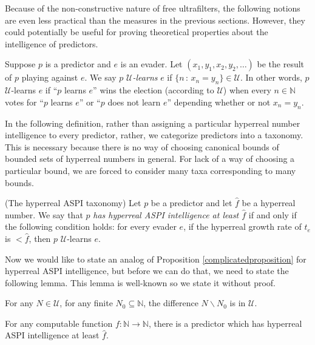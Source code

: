 \documentclass[twoside,11pt]{article}
\begin{document}
Because of the non-constructive nature of free ultrafilters, the following notions
are even less practical than the measures in the previous sections.
However, they could potentially be useful for
proving theoretical properties about the intelligence of predictors.

\begin{definition}
\label{Ulearndefn}
    Suppose $p$ is a predictor and $e$ is an evader. Let
    $(x_1,y_1,x_2,y_2,\ldots)$ be the result of $p$ playing against $e$.
    We say $p$ \emph{$\mathcal U$-learns} $e$ if
    $\{n\,:\,x_n=y_n\}\in\mathcal U$.
    In other words, $p$ $\mathcal U$-learns $e$ if ``$p$ learns $e$''
    wins the election (according to $\mathcal U$)
    when every $n\in\mathbb N$ votes for ``$p$ learns $e$''
    or ``$p$ does not learn $e$'' depending whether or not $x_n=y_n$.
\end{definition}

In the following
definition, rather than assigning a particular hyperreal number intelligence to every
predictor, rather, we categorize predictors into a taxonomy.
This is necessary because there is no way of choosing canonical bounds
of bounded sets of hyperreal numbers in general. For lack of a way of
choosing a particular bound, we are forced to consider many taxa corresponding
to many bounds.

\begin{definition}
\label{hyperrealhibbardintelligencedefn}
    (The hyperreal ASPI taxonomy)
    Let $p$ be a predictor and let $\hat f$ be a hyperreal number.
    We say that $p$ \emph{has hyperreal ASPI intelligence at least $\hat f$}
    if and only if the following condition holds:
    for every evader $e$, if the hyperreal growth rate of $t_e$ is
    $<\hat f$, then $p$ $\mathcal U$-learns $e$.
\end{definition}

Now we would like to state an analog of Proposition \ref{complicatedproposition}
for hyperreal ASPI intelligence, but before we can do that, we need to state the
following lemma. This lemma is well-known so we state it without proof.

\begin{lemma}
\label{technicallemmaaboutultrafilters}
    For any $N\in\mathcal U$, for any finite $N_0\subseteq\mathbb N$,
    the difference $N\backslash N_0$ is in $\mathcal U$.
\end{lemma}

\begin{proposition}
    For any computable function $f:\mathbb N\to\mathbb N$, there is a predictor which has
    hyperreal ASPI intelligence at least $\hat f$.
\end{proposition}
\end{document}
